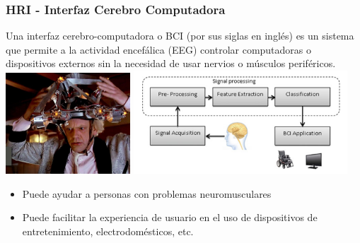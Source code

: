 \documentclass[10pt,spanish,aspectratio=1610]{beamer}
\begin{document}
\begin{frame}\frametitle{HRI - Interfaz Cerebro Computadora}
  Una interfaz cerebro-computadora o BCI (por sus siglas en inglés) es un sistema que permite a la actividad encefálica (EEG) controlar computadoras o dispositivos externos sin la necesidad de usar nervios o músculos periféricos.\\
  \centering
  \includegraphics[width=0.35\textwidth]{Figures/BTTFHelmet.jpg}
  \includegraphics[width=0.6\textwidth]{Figures/BCI1.png}
  \begin{itemize}
  \item Puede ayudar a personas con problemas neuromusculares
  \item Puede facilitar la experiencia de usuario en el uso de dispositivos de entretenimiento, electrodomésticos, etc. 
  \end{itemize}
\end{frame}
\end{document}
